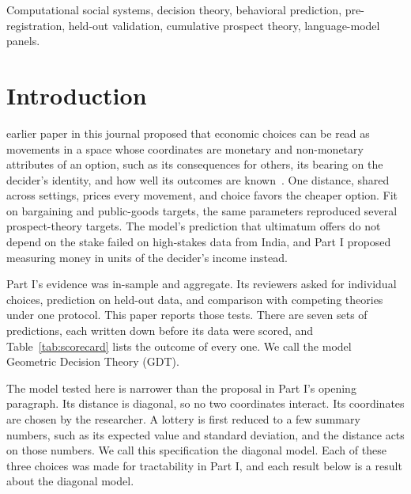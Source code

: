 \documentclass[journal]{IEEEtran}
\begin{document}
\begin{IEEEkeywords}
Computational social systems, decision theory, behavioral prediction, pre-registration, held-out validation, cumulative prospect theory, language-model panels.
\end{IEEEkeywords}

\section{Introduction}
\label{sec:intro}

 earlier paper in this journal proposed that economic choices can be read as movements in a space whose coordinates are monetary and non-monetary attributes of an option, such as its consequences for others, its bearing on the decider's identity, and how well its outcomes are known~\cite{bond2026partI}.
One distance, shared across settings, prices every movement, and choice favors the cheaper option.
Fit on bargaining and public-goods targets, the same parameters reproduced several prospect-theory targets.
The model's prediction that ultimatum offers do not depend on the stake failed on high-stakes data from India, and Part I proposed measuring money in units of the decider's income instead.

Part I's evidence was in-sample and aggregate.
Its reviewers asked for individual choices, prediction on held-out data, and comparison with competing theories under one protocol.
This paper reports those tests.
There are seven sets of predictions, each written down before its data were scored, and Table~\ref{tab:scorecard} lists the outcome of every one.
We call the model Geometric Decision Theory (GDT).

The model tested here is narrower than the proposal in Part I's opening paragraph.
Its distance is diagonal, so no two coordinates interact.
Its coordinates are chosen by the researcher.
A lottery is first reduced to a few summary numbers, such as its expected value and standard deviation, and the distance acts on those numbers.
We call this specification the diagonal model.
Each of these three choices was made for tractability in Part I, and each result below is a result about the diagonal model.
\end{document}
